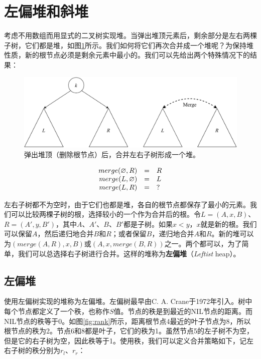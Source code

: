 \documentclass[b5paper]{ctexart}
\begin{document}
\section{左偏堆和斜堆}
\label{ebheap}

考虑不用数组而用显式的二叉树实现堆。当弹出堆顶元素后，剩余部分是左右两棵子树，它们都是堆，如图\ref{fig:lvr}所示。我们如何将它们再次合并成一个堆呢？为保持堆性质，新的根节点必须是剩余元素中最小的。我们可以先给出两个特殊情况下的结果：

\begin{figure}[htbp]
  \centering
  \includegraphics[scale=0.5]{img/lkr}
  \caption{弹出堆顶（删除根节点）后，合并左右子树形成一个堆。}
  \label{fig:lvr}
\end{figure}

\[
\begin{array}{rcl}
merge(\varnothing, R) & = & R \\
merge(L, \varnothing) & = & L \\
merge(L, R) & = & ? \\
\end{array}
\]

左右子树都不为空时，由于它们也都是堆，各自的根节点都保存了最小的元素。我们可以比较两棵子树的根，选择较小的一个作为合并后的根。令$L = (A, x, B)$、$R = (A', y, B')$，其中$A$、$A'$、$B$、$B'$都是子树。如果$x < y$，$x$就是新的根。我们可以保留$A$，然后递归地合并$B$和$R$；或者保留$B$，递归地合并$A$和$R$。新的堆可以为$(merge(A, R), x, B)$或$(A, x, merge(B, R))$之一。两个都可以，为了简单，我们可以总选择右子树进行合并。这样的堆称为\textbf{左偏堆}（{\em Leftist} heap）。

\subsection{左偏堆}
  

使用左偏树实现的堆称为左偏堆。左偏树最早由C. A. Crane于1972年引入\cite{wiki-leftist-tree}。树中每个节点都定义了一个秩，也称作$S$值。节点的秩是到最近的NIL节点的距离。而NIL节点的秩等于0。如图\ref{fig:rank}所示，距离根节点4最近的叶子节点为8，所以根节点的秩为2。节点6和8都是叶子，它们的秩为1。虽然节点5的左子树不为空，但是它的右子树为空，因此秩等于1。使用秩，我们可以定义合并策略如下，记左右子树的秩分别为$r_l$、$r_r$：
\end{document}
